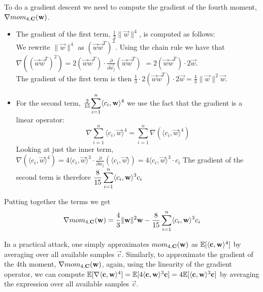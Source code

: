 To do a gradient descent we need to compute the gradient of the fourth moment, $\nabla mom_{4, \mathbf{C}} (\mathbf{w})$.
\begin{itemize}
    \item The gradient of the first term, $\frac{1}{3} \lVert \vec{w} \rVert ^4$, is computed as follows: \\
        We rewrite $\lVert \vec{w} \rVert ^4$ as $(\vec{w}\vec{w}^T)^2$. Using the chain rule we have that \\
        $\nabla ((\vec{w}\vec{w}^T)^2) = 2(\vec{w}\vec{w}^T) \cdot \frac{\partial}{\partial \vec{w}_j}(\vec{w}\vec{w}^T)$
        $= 2(\vec{w}\vec{w}^T) \cdot 2 \vec{w}$. \\ 
        The gradient of the first term is then $\frac{1}{3} \cdot 2(\vec{w}\vec{w}^T) \cdot 2 \vec{w} = \frac{4}{3} \lVert \vec{w} \rVert ^2 \vec{w}$.
    \item For the second term, $\frac{2}{15} \mathlarger{\sum_{i=1}^{n} \langle c_i, \vec{w} \rangle ^4}$ we use the fact that the gradient is a linear operator:
        \[\nabla \sum_{i=1}^{n}\langle c_i, \vec{w} \rangle ^4 = \sum_{i=1}^{n}\nabla (\langle c_i, \vec{w} \rangle ^4)\]
        Looking at just the inner term, $\nabla (\langle c_i, \vec{w} \rangle ^4) = 4 \langle c_i, \vec{w} \rangle ^3 
        \cdot \frac{\partial}{\partial w_j} (\langle c_i, \vec{w} \rangle) = 4 \langle c_i, \vec{w} \rangle ^3 \cdot c_i$
        The gradient of the second term is therefore $\mathlarger{\frac{8}{15} \sum_{i=1}^{n} \langle c_i, \vec{w} \rangle ^3 c_i}$
\end{itemize}
Putting together the terms we get
\[ \nabla mom_{4, \mathbf{C}}(\mathbf{w}) =  \frac{4}{3} \lVert \mathbf{w} \rVert ^2 \mathbf{w} - \frac{8}{15} \sum_{i=1}^{n} \langle c_i, \mathbf{w} \rangle ^3 c_i\]


In a practical attack, one simply approximates $mom_{4, \mathbf{C}}(\mathbf{w})$ as $\mathbb{E}[\langle \mathbf{c}, \mathbf{w} \rangle ^4]$ by averaging over all available samples $\vec{c}$.
Similarly, to approximate the gradient of the 4th moment, $\nabla mom_{4, \mathbf{C}}(\mathbf{w})$, again, using the linearity of the gradient operator, 
we can compute $\mathbb{E} [\nabla \langle \mathbf{c}, \mathbf{w} \rangle ^4] = \mathbb{E} [4 \langle \mathbf{c}, \mathbf{w} \rangle ^3 \mathbf{c}] = 4 \mathbb{E} [\langle \mathbf{c}, \mathbf{w} \rangle ^3 \mathbf{c}]$
by averaging the expression over all available samples $\vec{c}$.

